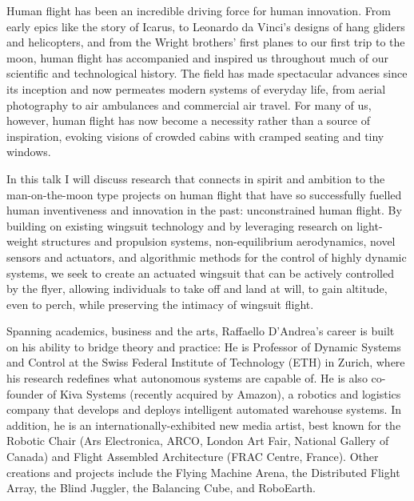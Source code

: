 {
Human flight has been an incredible driving force for human innovation. From early epics like the story of Icarus, to Leonardo da Vinci's designs of hang gliders and helicopters, and from the Wright brothers’ first planes to our first trip to the moon, human flight has accompanied and inspired us throughout much of our scientific and technological history. The field has made spectacular advances since its inception and now permeates modern systems of everyday life, from aerial photography to air ambulances and commercial air travel. For many of us, however, human flight has now become a necessity rather than a source of inspiration, evoking visions of crowded cabins with cramped seating and tiny windows.

In this talk I will discuss research that connects in spirit and ambition to the man-on-the-moon type projects on human flight that have so successfully fuelled human inventiveness and innovation in the past: unconstrained human flight. By building on existing wingsuit technology and by leveraging research on light-weight structures and propulsion systems, non-equilibrium aerodynamics, novel sensors and actuators, and algorithmic methods for the control of highly dynamic systems, we seek to create an actuated wingsuit that can be actively controlled by the flyer, allowing individuals to take off and land at will, to gain altitude, even to perch, while preserving the intimacy of wingsuit flight.
}{
Spanning academics, business and the arts, Raffaello D'Andrea's career is built on his ability to bridge theory and practice: He is Professor of Dynamic Systems and Control at the Swiss Federal Institute of Technology (ETH) in Zurich, where his research redefines what autonomous systems are capable of. He is also co-founder of Kiva Systems (recently acquired by Amazon), a robotics and logistics company that develops and deploys intelligent automated warehouse systems. In addition, he is an internationally-exhibited new media artist, best known for the Robotic Chair (Ars Electronica, ARCO, London Art Fair, National Gallery of Canada) and Flight Assembled Architecture (FRAC Centre, France). Other creations and projects include the Flying Machine Arena, the Distributed Flight Array, the Blind Juggler, the Balancing Cube, and RoboEarth.
}



